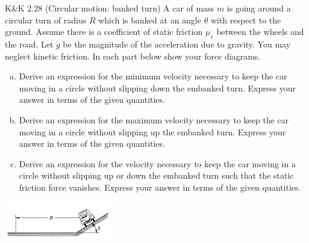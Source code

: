 \documentclass{esg8012pset}
\begin{document}
\begin{problem}{K\&K 2.28 (Circular motion: banked turn)}
  A car of mass $m$ is going around a circular turn of radius $R$ which is banked at an angle $\theta$ with respect to the ground. Assume there is a coefficient of static friction $\mu_s$ between the wheels and the road. Let $g$ be the magnitude of the acceleration due to gravity. You may neglect kinetic friction. In each part below show your force diagrams.
  \begin{enumerate}[a)]
    \item Derive an expression for the minimum velocity necessary to keep the car moving in a circle without slipping down the embanked turn. Express your answer in terms of the given quantities.
    \item Derive an expression for the maximum velocity necessary to keep the car moving in a circle without slipping up the embanked turn. Express your answer in terms of the given quantities.
    \item Derive an expression for the velocity necessary to keep the car moving in a circle without slipping up or down the embanked turn such that the static friction force vanishes. Express your answer in terms of the given quantities.
  \end{enumerate}
  \begin{center}\includegraphics[width=0.35\textwidth]{ps03_3}\end{center}
\end{problem}
\end{document}
